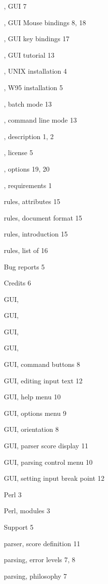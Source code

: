 \begin{theindex}
\item  \program , GUI  7
\item  \program , GUI Mouse bindings  8, 18
\item  \program , GUI key bindings  17
\item  \program , GUI tutorial 13
\item  \program , UNIX installation 4
\item  \program , W95 installation 5
\item  \program , batch mode 13
\item  \program , command line mode 13
\item  \program , description 1, 2
\item  \program , license 5
\item  \program , options 19, 20
\item  \program , requirements 1
\item  rules, attributes  15
\item  rules, document format  15
\item  rules, introduction 15
\item  rules, list of 16
\item Bug reports 5
\item Credits 6
\item GUI, 
\item GUI, 
\item GUI, 
\item GUI, 
\item GUI, command buttons 8
\item GUI, editing input text 12
\item GUI, help menu 10
\item GUI, options menu 9
\item GUI, orientation  8
\item GUI, parser score display 11
\item GUI, parsing control menu 10
\item GUI, setting input break point 12
\item Perl 3
\item Perl, modules 3
\item Support 5
\item parser, score definition 11
\item parsing, error levels 7, 8
\item parsing, philosophy 7
\end{theindex}
